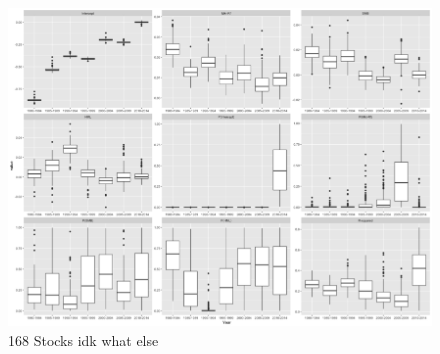 \documentclass{beamer}
\begin{document}

\begin{frame}
\begin{figure}
\centering
\includegraphics[scale=.6]{samplesplots.png}
\caption{168 Stocks idk what else}
\end{figure}

\end{frame}
\end{document}
